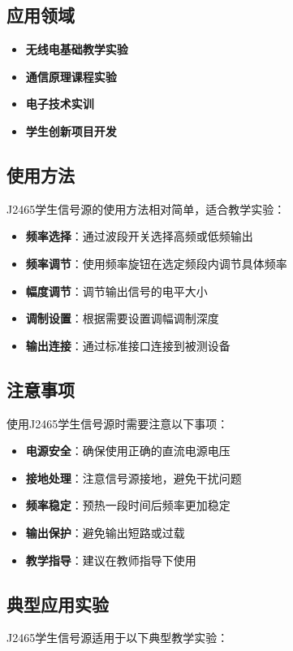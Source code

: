 \documentclass[12pt,UTF8]{ctexbook}
\begin{document}
\subsection{应用领域}
\begin{itemize}[leftmargin=2cm]
	\item \textbf{无线电基础教学实验}
	\item \textbf{通信原理课程实验}
	\item \textbf{电子技术实训}
	\item \textbf{学生创新项目开发}
\end{itemize}

\subsection{使用方法}
J2465学生信号源的使用方法相对简单，适合教学实验：

\begin{itemize}[leftmargin=2cm]
	\item \textbf{频率选择}：通过波段开关选择高频或低频输出
	\item \textbf{频率调节}：使用频率旋钮在选定频段内调节具体频率
	\item \textbf{幅度调节}：调节输出信号的电平大小
	\item \textbf{调制设置}：根据需要设置调幅调制深度
	\item \textbf{输出连接}：通过标准接口连接到被测设备
\end{itemize}

\subsection{注意事项}
使用J2465学生信号源时需要注意以下事项：

\begin{itemize}[leftmargin=2cm]
	\item \textbf{电源安全}：确保使用正确的直流电源电压
	\item \textbf{接地处理}：注意信号源接地，避免干扰问题
	\item \textbf{频率稳定}：预热一段时间后频率更加稳定
	\item \textbf{输出保护}：避免输出短路或过载
	\item \textbf{教学指导}：建议在教师指导下使用
\end{itemize}

\subsection{典型应用实验}
J2465学生信号源适用于以下典型教学实验：
\end{document}
